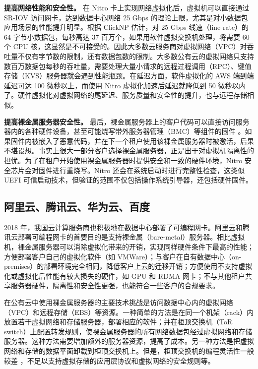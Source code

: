\textbf{提高网络性能和安全性。}
在 Nitro 卡上实现网络虚拟化后，虚拟机可以直接通过 SR-IOV 访问网卡，达到数据中心网络 25 Gbps 的理论上限，尤其是对小数据包应用场景的性能提升明显。根据 ClickNP \cite{li2016clicknp} 估计，对 25 Gbps 线速（line-rate）的 64 字节小数据包，每秒高达 37 百万个，如果用软件虚拟交换机处理，将需要 60 个 CPU 核，这显然是不可接受的。因此大多数云服务商对虚拟网络（VPC）对吞吐量不仅有字节数的限制，还有数据包数的限制。大多数公有云的虚拟网络只支持数百万数据包每秒的吞吐量，需要处理大量小请求的远程过程调用（RPC）、键值存储（KVS）服务器就会遇到性能瓶颈。在延迟方面，软件虚拟化的 AWS 端到端延迟可达 100 微秒以上，而使用 Nitro 虚拟化加速后延迟就降低到 50 微秒以内了。硬件虚拟化对虚拟网络的尾延迟、服务质量和安全性的提升，也与远程存储相似。

\textbf{提高裸金属服务器安全性。}
最后，裸金属服务器上的客户代码可以直接访问服务器内的各种硬件设备，甚至可能烧写带外服务器管理（BMC）等组件的固件 \cite{bare-metal-security}。如果固件内被嵌入了恶意代码，并在下一个租户使用该裸金属服务器时被激活，后果不堪设想。事实上很大一部分客户选择裸金属服务器，正是出于对虚拟机隔离性的担忧。为了在租户开始使用裸金属服务器时提供安全和一致的硬件环境，Nitro 安全芯片会对固件进行重烧写。Nitro 还会在系统启动时进行完整性检查，这类似 UEFI 可信启动技术，但验证的范围不仅包括操作系统引导器，还包括硬件固件。

\subsection{阿里云、腾讯云、华为云、百度}

2018 年，我国云计算服务商也积极地在数据中心部署了可编程网卡。阿里云和腾讯云部署可编程网卡的首要目的是支持裸金属（bare-metal）服务器。相比虚拟机，裸金属服务器可以消除虚拟化带来的开销，实现同样硬件条件下最高的性能；方便部署客户自己的虚拟化软件（如 VMWare）；与客户在自有数据中心（on-premises）的部署环境完全相同，降低客户上云的迁移开销；方便使用不支持虚拟化或虚拟化后性能有较大损失的硬件，如 GPU 和 RDMA 网卡；不与其他租户共享服务器硬件，隔离性和安全性更强，也能符合一些客户的合规要求。

在公有云中使用裸金属服务器的主要技术挑战是访问数据中心内的虚拟网络（VPC）和远程存储（EBS）等资源。一种简单的方法是在同一个机架（rack）内放置若干虚拟网络和存储服务器，部署相应的软件；并在柜顶交换机（ToR switch）上配置转发规则，使裸金属服务器的所有网络数据包经过虚拟网络和存储服务器。这种方法需要增加额外的服务器资源，提高了成本。另一种方法是把虚拟网络和存储的数据平面卸载到柜顶交换机上。但是，柜顶交换机的编程灵活性一般较差 \cite{tencent-smartnic}，不足以支持虚拟存储的应用层协议和虚拟网络的安全规则等。

